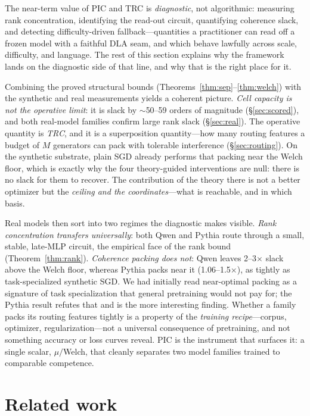 \documentclass[sigconf,nonacm]{acmart}
\theoremstyle{definition}
\begin{document}
The near-term value of PIC and TRC is \emph{diagnostic}, not algorithmic: measuring
rank concentration, identifying the read-out circuit, quantifying coherence slack,
and detecting difficulty-driven fallback---quantities a practitioner can read off a
frozen model with a faithful DLA seam, and which behave lawfully across scale,
difficulty, and language. The rest of this section explains why the framework lands
on the diagnostic side of that line, and why that is the right place for it.

Combining the proved structural bounds (Theorems~\ref{thm:sep}--\ref{thm:welch}) with
the synthetic and real measurements yields a coherent picture. \emph{Cell capacity
is not the operative limit}: it is slack by $\sim$50--59 orders of magnitude
(\S\ref{sec:scored}), and both real-model families confirm large rank slack
(\S\ref{sec:real}). The operative quantity is \emph{TRC}, and it is a superposition
quantity---how many routing features a budget of $M$ generators can pack with
tolerable interference (\S\ref{sec:routing}). On the synthetic substrate, plain SGD
already performs that packing near the Welch floor, which is exactly why the four
theory-guided interventions are null: there is no slack for them to recover. The
contribution of the theory there is not a better optimizer but the \emph{ceiling and
the coordinates}---what is reachable, and in which basis.

Real models then sort into two regimes the diagnostic makes visible. \emph{Rank
concentration transfers universally}: both Qwen and Pythia route through a small,
stable, late-MLP circuit, the empirical face of the rank bound
(Theorem~\ref{thm:rank}). \emph{Coherence packing does not}: Qwen leaves 2--3$\times$
slack above the Welch floor, whereas Pythia packs near it (1.06--1.5$\times$), as
tightly as task-specialized synthetic SGD. We had initially read near-optimal packing
as a signature of task specialization that general pretraining would not pay for; the
Pythia result refutes that and is the more interesting finding. Whether a family packs
its routing features tightly is a property of the \emph{training recipe}---corpus,
optimizer, regularization---not a universal consequence of pretraining, and not
something accuracy or loss curves reveal. PIC is the instrument that surfaces it: a
single scalar, $\mu/$Welch, that cleanly separates two model families trained to
comparable competence.

\section{Related work}
\end{document}
